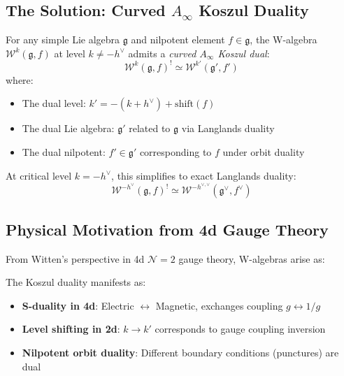 \subsection{The Solution: Curved $A_\infty$ Koszul Duality}

\begin{theorem}\label{thm:w-algebra-koszul-main}
For any simple Lie algebra $\mathfrak{g}$ and nilpotent element $f \in \mathfrak{g}$, the W-algebra $\mathcal{W}^k(\mathfrak{g}, f)$ at level $k \neq -h^\vee$ admits a \emph{curved $A_\infty$ Koszul dual}:
\begin{equation}
\boxed{\mathcal{W}^k(\mathfrak{g}, f)^! \simeq \mathcal{W}^{k'}(\mathfrak{g}', f')}
\end{equation}
where:
\begin{itemize}
\item The dual level: $k' = -(k + h^\vee) + \text{shift}(f)$
\item The dual Lie algebra: $\mathfrak{g}'$ related to $\mathfrak{g}$ via Langlands duality
\item The dual nilpotent: $f' \in \mathfrak{g}'$ corresponding to $f$ under orbit duality
\end{itemize}

At critical level $k = -h^\vee$, this simplifies to exact Langlands duality:
\begin{equation}
\mathcal{W}^{-h^\vee}(\mathfrak{g}, f)^! \simeq \mathcal{W}^{-h^{\vee,\vee}}(\mathfrak{g}^\vee, f^\vee)
\end{equation}
\end{theorem}

\subsection{Physical Motivation from 4d Gauge Theory}

\begin{remark}
From Witten's perspective in 4d $\mathcal{N}=2$ gauge theory, W-algebras arise as:
\begin{center}
\end{center}

The Koszul duality manifests as:
\begin{itemize}
\item \textbf{S-duality in 4d}: Electric $\leftrightarrow$ Magnetic, exchanges coupling $g \leftrightarrow 1/g$
\item \textbf{Level shifting in 2d}: $k \to k'$ corresponds to gauge coupling inversion
\item \textbf{Nilpotent orbit duality}: Different boundary conditions (punctures) are dual
\end{itemize}
\end{remark}


